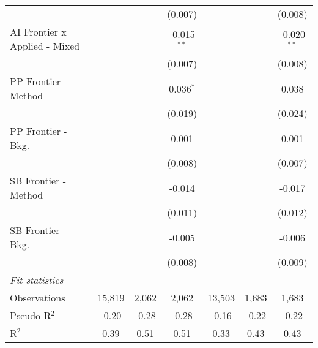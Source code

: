 \begin{tabular}{lcccccc}
                                 &         &              & (0.007)       &              &         & (0.008)\\   
   AI Frontier x Applied - Mixed &         &              & -0.015$^{**}$ &              &         & -0.020$^{**}$\\   
                                 &         &              & (0.007)       &              &         & (0.008)\\   
   PP Frontier - Method          &         &              & 0.036$^{*}$   &              &         & 0.038\\   
                                 &         &              & (0.019)       &              &         & (0.024)\\   
   PP Frontier - Bkg.            &         &              & 0.001         &              &         & 0.001\\   
                                 &         &              & (0.008)       &              &         & (0.007)\\   
   SB Frontier - Method          &         &              & -0.014        &              &         & -0.017\\   
                                 &         &              & (0.011)       &              &         & (0.012)\\   
   SB Frontier - Bkg.            &         &              & -0.005        &              &         & -0.006\\   
                                 &         &              & (0.008)       &              &         & (0.009)\\   
   \midrule
   \emph{Fit statistics}\\
   Observations                  & 15,819  & 2,062        & 2,062         & 13,503       & 1,683   & 1,683\\  
   Pseudo R$^2$                  & -0.20   & -0.28        & -0.28         & -0.16        & -0.22   & -0.22\\  
   R$^2$                         & 0.39    & 0.51         & 0.51          & 0.33         & 0.43    & 0.43\\  
   

\end{tabular}
